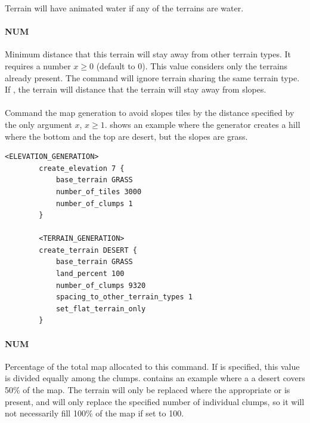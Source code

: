 \begin{appendices}
    \begin{note}
        Terrain will have animated water if any of the terrains are water.
    \end{note}

    \paragraph{ NUM}

    Minimum distance that this terrain will stay away from other terrain types. It requires a number $x \geq 0$ (default to 0). This value considers only the terrains already present. The command will ignore terrain sharing the same terrain type. If , the terrain will distance that the terrain will stay away from slopes.

    \paragraph{}

    Command the map generation to avoid slopes tiles by the distance specified by the only argument $x$, $x \geq 1$.  shows an example where the generator creates a hill where the bottom and the top are desert, but the slopes are grass.

    \begin{lstlisting}[language={rms},label={lst:flatterrainonly}]
        <ELEVATION_GENERATION>
        create_elevation 7 {
            base_terrain GRASS
            number_of_tiles 3000
            number_of_clumps 1
        }

        <TERRAIN_GENERATION>
        create_terrain DESERT {
            base_terrain GRASS
            land_percent 100
            number_of_clumps 9320
            spacing_to_other_terrain_types 1
            set_flat_terrain_only
        }
    \end{lstlisting}

    \paragraph{ NUM}

    Percentage of the total map allocated to this  command. If  is specified, this value is divided equally among the clumps.  contains an example where a a desert covers 50\% of the map. The terrain will only be replaced where the appropriate  or  is present, and will only replace the specified number of individual clumps, so it will not necessarily fill 100\% of the map if set to 100.


\end{appendices}
